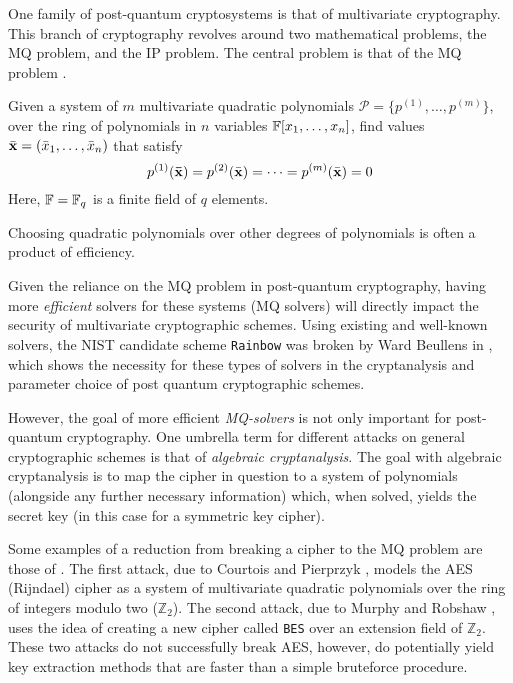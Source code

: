 One family of post-quantum cryptosystems is that of multivariate cryptography. This branch of cryptography revolves around two mathematical problems, the MQ problem, and the IP problem. The central problem is that of the MQ problem \cite{Ding2020}.

\begin{defn}\label{sec1:def:mq}
Given a system of $m$ multivariate quadratic polynomials $\mathcal{P} = \{p^{(1)}, \dots, p^{(m)}\}$, over the ring of polynomials in $n$ variables $\mathbb{F}[x_1, \dots, x_n]$, find values $\Bar{\mathbf{x}} = (\Bar{x}_1, \dots, \Bar{x}_n)$ that satisfy
$$
    p^{(1)}(\mathbf{\Bar{\mathbf{x}}}) =  p^{(2)}(\Bar{\mathbf{x}}) = \dots = p^{(m)}(\Bar{\mathbf{x}}) = 0 
$$
Here, $\mathbb{F} = \mathbb{F}_q$ is a finite field of $q$ elements. 
\end{defn}

Choosing quadratic polynomials over other degrees of polynomials is often a product of efficiency.

Given the reliance on the MQ problem in post-quantum cryptography, having more \textit{efficient} solvers for these systems (MQ solvers) will directly impact the security of multivariate cryptographic schemes. Using existing and well-known solvers, the NIST candidate scheme \texttt{Rainbow} was broken by Ward Beullens in \cite{cryptoeprint:2022/214}, which shows the necessity for these types of solvers in the cryptanalysis and parameter choice of post quantum cryptographic schemes.

However, the goal of more efficient \textit{MQ-solvers} is not only important for post-quantum cryptography. One umbrella term for different attacks on general cryptographic schemes is that of \textit{algebraic cryptanalysis}. The goal with algebraic cryptanalysis is to map the cipher in question to a system of polynomials (alongside any further necessary information) which, when solved, yields the secret key (in this case for a symmetric key cipher).

Some examples of a reduction from breaking a cipher to the MQ problem are those of \cite{nover2005algebraic}. The first attack, due to Courtois and Pierprzyk \cite{courtois2002cryptanalysis}, models the AES (Rijndael) cipher as a system of multivariate quadratic polynomials over the ring of integers modulo two ($\mathbb{Z}_2$). The second attack, due to Murphy and Robshaw \cite{10.1007/3-540-45708-9_1}, uses the idea of creating a new cipher called \texttt{BES} over an extension field of $\mathbb{Z}_2$. These two attacks do not successfully break AES, however, do potentially yield key extraction methods that are faster than a simple bruteforce procedure.

